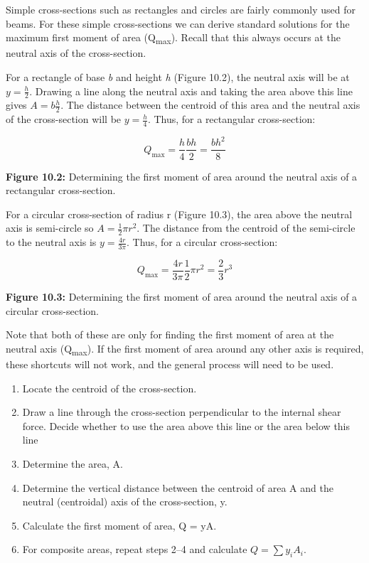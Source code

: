 \documentclass[
  letterpaper,
  DIV=11,
  numbers=noendperiod]{scrreprt}
\providecommand{\tightlist}{%
  \setlength{\itemsep}{0pt}\setlength{\parskip}{0pt}}\usepackage{longtable,booktabs,array}
\begin{document}
Simple cross-sections such as rectangles and circles are fairly commonly
used for beams. For these simple cross-sections we can derive standard
solutions for the maximum first moment of area (Q\textsubscript{max}).
Recall that this always occurs at the neutral axis of the cross-section.

For a rectangle of base \emph{b} and height \emph{h} (Figure 10.2), the
neutral axis will be at \(y=\frac{h}{2}\). Drawing a line along the
neutral axis and taking the area above this line gives
\(A=b \frac{h}{2}\). The distance between the centroid of this area and
the neutral axis of the cross-section will be \(y=\frac{h}{4}\). Thus,
for a rectangular cross-section:

\[
Q_{\max }=\frac{h}{4} \frac{b h}{2}=\frac{b h^2}{8}
\]

\textbf{Figure 10.2:} Determining the first moment of area around the
neutral axis of a rectangular cross-section.

For a circular cross-section of radius r (Figure 10.3), the area above
the neutral axis is semi-circle so \(A=\frac{1}{2} \pi r^2\). The
distance from the centroid of the semi-circle to the neutral axis is
\(y=\frac{4 r}{3 \pi}\). Thus, for a circular cross-section:

\[
Q_{\max }=\frac{4 r}{3 \pi} \frac{1}{2} \pi r^2=\frac{2}{3} r^3
\]

\textbf{Figure 10.3:} Determining the first moment of area around the
neutral axis of a circular cross-section.

Note that both of these are only for finding the first moment of area at
the neutral axis (Q\textsubscript{max}). If the first moment of area
around any other axis is required, these shortcuts will not work, and
the general process will need to be used.

\begin{tcolorbox}[enhanced jigsaw, breakable, opacityback=0, toptitle=1mm, left=2mm, colback=white, opacitybacktitle=0.6, colframe=quarto-callout-warning-color-frame, titlerule=0mm, arc=.35mm, leftrule=.75mm, bottomtitle=1mm, colbacktitle=quarto-callout-warning-color!10!white, rightrule=.15mm, title={Step-by-step:}, bottomrule=.15mm, toprule=.15mm, coltitle=black]

\begin{enumerate}
\def\labelenumi{\arabic{enumi}.}
\tightlist
\item
  Locate the centroid of the cross-section.
\item
  Draw a line through the cross-section perpendicular to the internal
  shear force. Decide whether to use the area above this line or the
  area below this line
\item
  Determine the area, A.
\item
  Determine the vertical distance between the centroid of area A and the
  neutral (centroidal) axis of the cross-section, y.
\item
  Calculate the first moment of area, Q = yA.
\item
  For composite areas, repeat steps 2--4 and calculate
  \(Q=\sum y_i A_i\).
\end{enumerate}

\end{tcolorbox}
\end{document}
